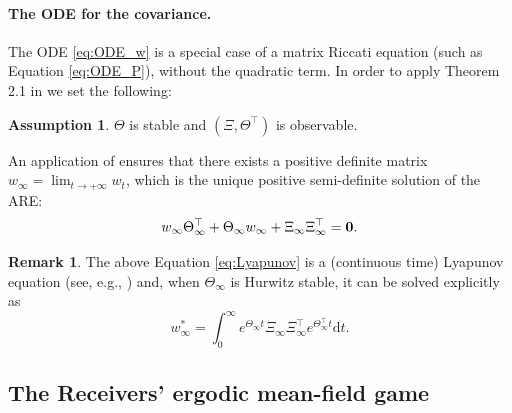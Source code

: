 \documentclass[a4paper,10pt]{article}
\newcommand{\D}{\mathrm{d}}
\theoremstyle{definition}
\newtheorem{remark}[theorem]{Remark}
\newtheorem{assumption}[theorem]{Assumption}
\theoremstyle{plain}
\numberwithin{equation}{section}
\begin{document}
\paragraph{The ODE for the covariance.}
The ODE \eqref{eq:ODE_w} is a special case of a matrix Riccati equation (such as Equation \eqref{eq:ODE_P}), without the quadratic term. In order to apply Theorem 2.1 in \cite{Wohnam68}  we set the following: 
\begin{assumption}\label{ass_stab_cov}
	$\Theta$ is stable and $(\Xi, \Theta^\top )$ is observable. 
\end{assumption}
An application of \cite[Theorem 2.1]{Wohnam68} ensures that there exists a positive definite matrix $w_\infty = \lim_{t \rightarrow +\infty} w_t$, which is the unique positive semi-definite solution of the ARE: 
\begin{equation}\label{eq:Lyapunov}
w_\infty \Theta_\infty ^\top + \Theta_\infty w_\infty +\Xi_\infty \Xi_\infty^\top =\bold{0}.
\end{equation}
\begin{remark}
	The above Equation \eqref{eq:Lyapunov} is a (continuous time) Lyapunov equation (see, e.g., \cite[Section 3.3., page 123]{Khalil96}) and, when $\Theta_\infty$ is Hurwitz stable, it can be solved explicitly as
	\[  w^* _\infty = \int_0 ^\infty e^{\Theta_\infty t} \Xi_\infty \Xi_\infty ^\top e^{\Theta_\infty ^\top t} \D t. \]
\end{remark}



\subsection{The Receivers' ergodic mean-field game}\label{ssec:MFG_erg}
\end{document}
